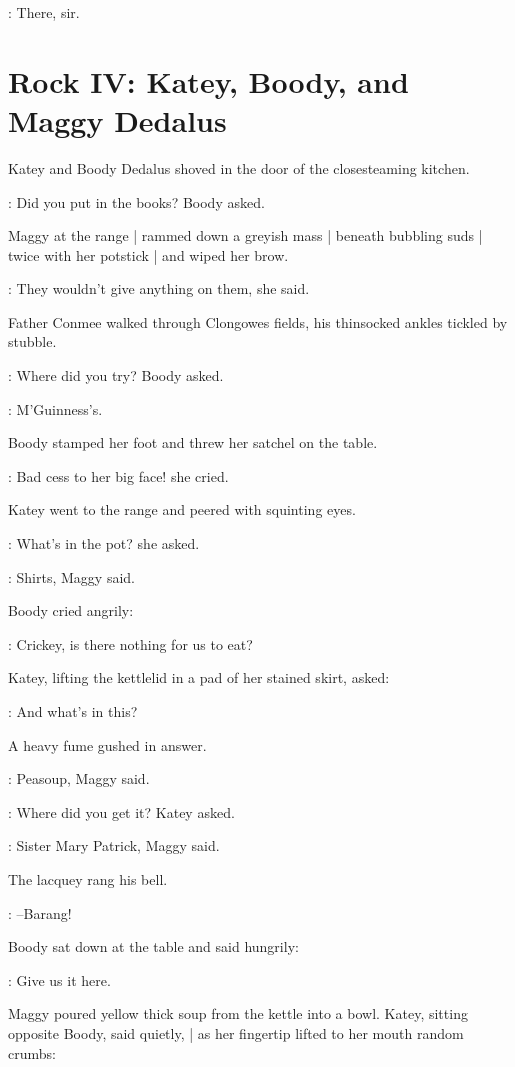 :
There, sir.


\section*{Rock IV: Katey, Boody, and Maggy Dedalus}


Katey and Boody Dedalus shoved in the door of the closesteaming kitchen.

\boody:
Did you put in the books?
Boody asked.

Maggy at the range |
rammed down a greyish mass |
beneath bubbling suds |
twice with her potstick |
and wiped her brow.

\maggy:
They wouldn't give anything on them,
she said.

Father Conmee walked through Clongowes fields,
his thinsocked ankles tickled by stubble.

\boody:
Where did you try? Boody asked.

\maggy:
M'Guinness's.

Boody stamped her foot and threw her satchel on the table.

\boody:
Bad cess to her big face! she cried.

Katey went to the range
and peered with squinting eyes.

\katey:
What's in the pot? she asked.

\maggy:
Shirts, Maggy said.

Boody cried angrily:

\boody:
Crickey, is there nothing for us to eat?

Katey, lifting the kettlelid in a pad of her stained skirt, asked:

\katey:
And what's in this?

A heavy fume gushed in answer.

\maggy:
Peasoup, Maggy said.

\katey:
Where did you get it? Katey asked.

\maggy:
Sister Mary Patrick,
Maggy said.

The lacquey rang his bell.

\lacquey:
--Barang!

Boody sat down at the table and said hungrily:

\boody:
Give us it here.

Maggy poured yellow thick soup from the kettle into a bowl.
Katey, sitting opposite Boody, said quietly, |
as her fingertip lifted to her mouth random crumbs:

